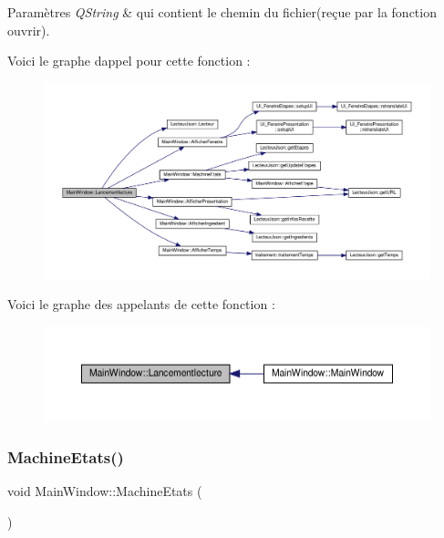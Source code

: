 \begin{DoxyParams}{Paramètres}
{\em Q\+String} & qui contient le chemin du fichier(reçue par la fonction ouvrir). \\
\hline
\end{DoxyParams}
Voici le graphe d\textquotesingle{}appel pour cette fonction \+:
\nopagebreak
\begin{figure}[H]
\begin{center}
\leavevmode
\includegraphics[width=350pt]{class_main_window_ac368dfd7e2609f0cb72fc1428771aa97_cgraph}
\end{center}
\end{figure}
Voici le graphe des appelants de cette fonction \+:
\nopagebreak
\begin{figure}[H]
\begin{center}
\leavevmode
\includegraphics[width=350pt]{class_main_window_ac368dfd7e2609f0cb72fc1428771aa97_icgraph}
\end{center}
\end{figure}
\mbox{\label{class_main_window_a59cd9a83e43405ae1ad5c18e79b04db5}} 
\subsubsection{\texorpdfstring{Machine\+Etats()}{MachineEtats()}}
{\footnotesize\ttfamily void Main\+Window\+::\+Machine\+Etats (\begin{DoxyParamCaption}{ }\end{DoxyParamCaption})}

